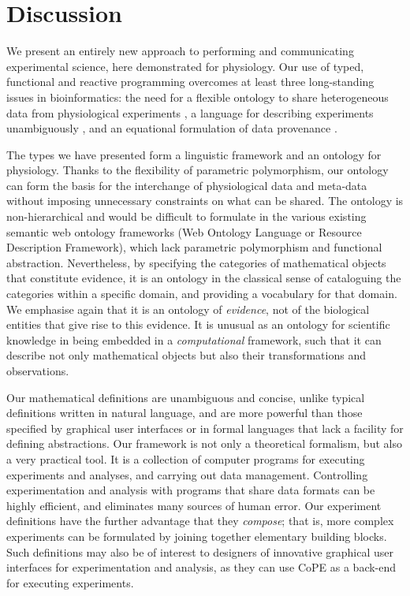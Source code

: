 \section*{Discussion}

We present an entirely new approach to performing and communicating
experimental science, here demonstrated for physiology.  Our use of
typed, functional and reactive programming overcomes at least three
long-standing issues in bioinformatics: the need for a flexible
ontology to share heterogeneous data from physiological experiments
\cite{Amari2002}, a language for describing experiments unambiguously
\cite{Murray-Rust2002}, and an equational formulation of data
provenance \cite{Pool2002}.

The types we have presented form a linguistic framework and an
ontology for physiology. Thanks to the flexibility of parametric polymorphism,
our ontology can form the basis for the interchange of physiological data
and meta-data without imposing unnecessary constraints on what can be
shared. The ontology is non-hierarchical and would be difficult to
formulate in the various existing semantic web ontology frameworks
(Web Ontology Language\cite{owlref} or Resource Description Framework), which lack
parametric polymorphism and functional abstraction. Nevertheless, by
specifying the categories of mathematical objects that constitute
evidence, it is an ontology in the classical sense of cataloguing the
categories within a specific domain, and providing a vocabulary for
that domain. We emphasise again that it is an ontology of
\emph{evidence}, not of the biological entities that give rise to this
evidence. It is unusual as an ontology for scientific knowledge in
being embedded in a \emph{computational} framework, such that it can
describe not only mathematical objects but also their transformations
and observations.

%
% 
%
Our mathematical definitions are unambiguous and concise, unlike
typical definitions written in natural language,
and are more powerful than those specified
by graphical user interfaces or in formal languages that lack a
facility for defining abstractions. Our framework is not only a
theoretical formalism, but also a very practical tool. It is a
collection of computer programs for executing experiments and
analyses, and carrying out data management. Controlling
experimentation and analysis with programs that share data formats can
be highly efficient, and eliminates many sources of human error. Our
experiment definitions have the further advantage that they
\emph{compose}; that is, more complex experiments can be formulated by
joining together elementary building blocks. Such definitions may also
be of interest to designers of innovative graphical user interfaces
for experimentation and analysis, as they can use CoPE as a back-end
for executing experiments.

